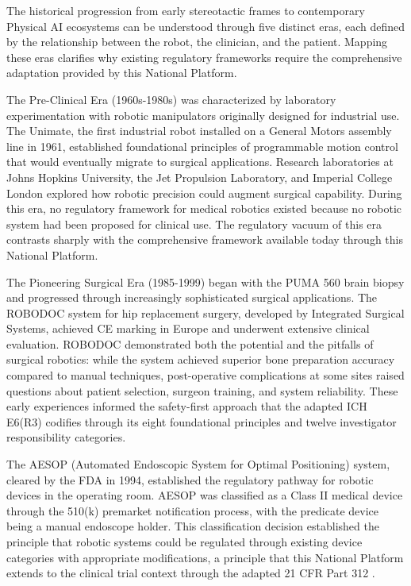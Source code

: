 The historical progression from early stereotactic frames to contemporary
Physical AI ecosystems can be understood through five distinct eras, each
defined by the relationship between the robot, the clinician, and the
patient. Mapping these eras clarifies why existing regulatory frameworks
require the comprehensive adaptation provided by this National Platform.

The Pre-Clinical Era (1960s-1980s) was characterized by laboratory
experimentation with robotic manipulators originally designed for industrial
use. The Unimate, the first industrial robot installed on a General Motors
assembly line in 1961, established foundational principles of programmable
motion control that would eventually migrate to surgical applications.
Research laboratories at Johns Hopkins University, the Jet Propulsion
Laboratory, and Imperial College London explored how robotic precision could
augment surgical capability. During this era, no regulatory framework for
medical robotics existed because no robotic system had been proposed for
clinical use. The regulatory vacuum of this era contrasts sharply with the
comprehensive framework available today through this National Platform.

The Pioneering Surgical Era (1985-1999) began with the PUMA 560 brain biopsy
and progressed through increasingly sophisticated surgical applications. The
ROBODOC system for hip replacement surgery, developed by Integrated Surgical
Systems, achieved CE marking in Europe and underwent extensive clinical
evaluation. ROBODOC demonstrated both the potential and the pitfalls of
surgical robotics: while the system achieved superior bone preparation
accuracy compared to manual techniques, post-operative complications at some
sites raised questions about patient selection, surgeon training, and system
reliability. These early experiences informed the safety-first approach that
the adapted ICH E6(R3) \cite{ich-adapt} codifies through its eight
foundational principles and twelve investigator responsibility categories.

The AESOP (Automated Endoscopic System for Optimal Positioning) system,
cleared by the FDA in 1994, established the regulatory pathway for robotic
devices in the operating room. AESOP was classified as a Class II medical
device through the 510(k) premarket notification process, with the
predicate device being a manual endoscope holder. This classification
decision established the principle that robotic systems could be regulated
through existing device categories with appropriate modifications, a
principle that this National Platform extends to the clinical trial context
through the adapted 21 CFR Part 312 \cite{cfr312-adapt}.

